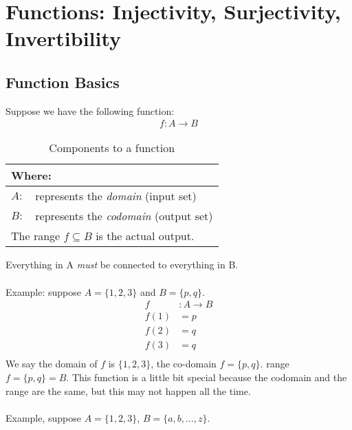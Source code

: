 \chapter{Functions: Injectivity, Surjectivity, Invertibility}
\label{sec:Functions}

\section{Function Basics}
\label{sec:FunctionBasics}
Suppose we have the following function:
\begin{align}
  f:A \to B
  \label{eq:FunctionForm}
\end{align}
\begin{table}[!hbt]
\label{tab:ComponentsToAFunction}
\begin{tabularx}{\linewidth}{| l X |}
  \hline
  \multicolumn{2}{|l|}{Where:} \\
  \hline \hline
  $A:$ & represents the \emph{domain} (input set) \\
  $B:$ & represents the \emph{codomain} (output set) \\
  \multicolumn{2}{|l|}{The range $f \subseteq B$ is the actual output.} \\
  \hline
\end{tabularx}
\caption{Components to a function}
\end{table}
Everything in A \emph{must} be connected to everything in B. \\
\\
Example: suppose $A = \{1, 2, 3\}$ and $B = \{p,q\}$. \\
\begin{align}
  f & : A \to B \nonumber \\
  f(1) & = p \nonumber \\
  f(2) & = q \nonumber \\
  f(3) & = q \nonumber \\
\end{align}
We say the domain of $f$ is $\{1, 2, 3\}$, the co-domain $f=\{p,q\}$. range $f=\{p,q\}=B$.
This function is a little bit special because the codomain and the range are the same, but
this may not happen all the time.\\
\\
Example, suppose $A = \{1, 2, 3\}$, $B = \{a, b, \ldots, z\}$. \\
